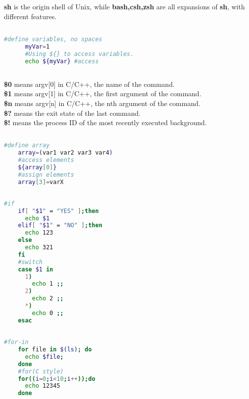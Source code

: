 \documentclass[12pt,a4paper]{article}
\theoremstyle{definition}
\begin{document}
\subsection{}
  \textbf{sh} is the origin shell of Unix, while \textbf{bash,csh,zsh} are all expansions of \textbf{sh}, with different features.
\subsection{}
  \begin{lstlisting}[language=sh]
      #define variables, no spaces
      myVar=1 
      #Using ${} to access variables.
      echo ${myVar} #access
  \end{lstlisting}
\subsection{}
  \textbf{\$0} means argv[0] in C/C++, the name of the command.\\
  \textbf{\$1} means argv[1] in C/C++, the first argument of the command.\\
  \textbf{\$n} means argv[n] in C/C++, the nth argument of the command.\\
  \textbf{\$?} means the exit state of the last command.\\
  \textbf{\$!} means the process ID of the most recently executed background.\\
\subsection{}
  \begin{lstlisting}[language=sh]
    #define array
    array=(var1 var2 var3 var4)
    #access elements
    ${array[0]}
    #assign elements
    array[3]=varX
  \end{lstlisting}
\subsection{}
  \begin{lstlisting}[language=sh]
    #if
    if[ "$1" = "YES" ];then
      echo $1
    elif[ "$1" = "NO" ];then
      echo 123
    else
      echo 321
    fi
    #switch
    case $1 in
      1)
        echo 1 ;;
      2)
        echo 2 ;;
      *)
        echo 0 ;;
    esac
  \end{lstlisting}
\subsection{}
  \begin{lstlisting}[language=sh]
    #for-in
    for file in $(ls); do
      echo $file;
    done
    #for(C style)
    for((i=0;i<10;i++));do
      echo 12345
    done
  \end{lstlisting}
\end{document}
